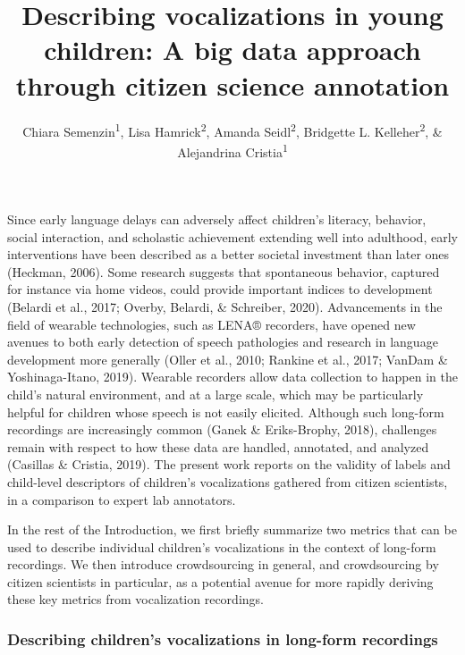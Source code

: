 \documentclass[english,,man]{apa6}
\author{Chiara Semenzin\textsuperscript{1}, Lisa Hamrick\textsuperscript{2}, Amanda Seidl\textsuperscript{2}, Bridgette L. Kelleher\textsuperscript{2}, \& Alejandrina Cristia\textsuperscript{1}}
\affiliation{
\vspace{0.5cm}
\textsuperscript{1} Laboratoire de Sciences Cognitives et de Psycholinguistique, Département d'Etudes cognitives, ENS, EHESS, CNRS, PSL University\\\textsuperscript{2} Purdue University}
\title{Describing vocalizations in young children: A big data approach through citizen science annotation}
\date{}
\begin{document}
\maketitle

Since early language delays can adversely affect children's literacy, behavior, social interaction, and scholastic achievement extending well into adulthood, early interventions have been described as a better societal investment than later ones (Heckman, 2006). Some research suggests that spontaneous behavior, captured for instance via home videos, could provide important indices to development (Belardi et al., 2017; Overby, Belardi, \& Schreiber, 2020). Advancements in the field of wearable technologies, such as LENA® recorders, have opened new avenues to both early detection of speech pathologies and research in language development more generally (Oller et al., 2010; Rankine et al., 2017; VanDam \& Yoshinaga-Itano, 2019). Wearable recorders allow data collection to happen in the child's natural environment, and at a large scale, which may be particularly helpful for children whose speech is not easily elicited. Although such long-form recordings are increasingly common (Ganek \& Eriks-Brophy, 2018), challenges remain with respect to how these data are handled, annotated, and analyzed (Casillas \& Cristia, 2019). The present work reports on the validity of labels and child-level descriptors of children's vocalizations gathered from citizen scientists, in a comparison to expert lab annotators.

In the rest of the Introduction, we first briefly summarize two metrics that can be used to describe individual children's vocalizations in the context of long-form recordings. We then introduce crowdsourcing in general, and crowdsourcing by citizen scientists in particular, as a potential avenue for more rapidly deriving these key metrics from vocalization recordings.

\hypertarget{describing-childrens-vocalizations-in-long-form-recordings}{%
\subsubsection{Describing children's vocalizations in long-form recordings}\label{describing-childrens-vocalizations-in-long-form-recordings}}
\end{document}
